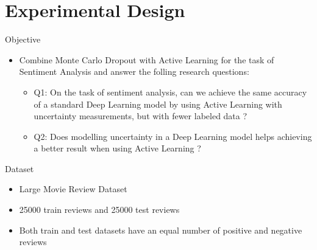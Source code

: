 \documentclass[10pt]{beamer}
\begin{document}
\section{Experimental Design}

\begin{frame}[fragile]{Objective}
\begin{itemize}
    \item Combine Monte Carlo Dropout with Active Learning for the task of
        Sentiment Analysis and answer the folling research questions:
        \vspace{0.5cm}

        \begin{itemize}
        \item \alert{Q1}: On the task of sentiment analysis, can we achieve the same
            accuracy of a standard Deep Learning model by using Active Learning
            with uncertainty measurements, but with fewer labeled data ?
        \item \alert{Q2}: Does modelling uncertainty in a Deep Learning model helps
            achieving a better result when using Active Learning ?
        \end{itemize}
    \vspace{0.5cm}
\end{itemize}
\end{frame}

\begin{frame}[fragile]{Dataset}
\begin{itemize}
    \item Large Movie Review Dataset
    \vspace{0.5cm}
    \item 25000 train reviews and 25000 test reviews
    \vspace{0.5cm}
    \item Both train and test datasets have an equal number of positive and
        negative reviews
\end{itemize}
\end{frame}
\end{document}
